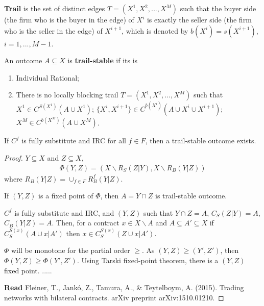 \documentclass[11pt]{elegantbook}
\begin{document}
\begin{definition}[Trail]
    \normalfont
    \textbf{Trail} is the set of distinct edges $T=(X^1,X^2,...,X^M)$ such that the buyer side (the firm who is the buyer in the edge) of $X^i$ is exactly the seller side (the firm who is the seller in the edge) of $X^{i+1}$, which is denoted by $b(X^i)=s(X^{i+1})$, $i=1,...,M-1$.
\end{definition}


\begin{definition}
    \normalfont
    An outcome $A\subseteq X$ is \textbf{trail-stable} if its is
    \begin{enumerate}
        \item Individual Rational;
        \item There is no locally blocking trail $T=(X^1,X^2,...,X^M)$ such that
        \subitem $X^1\in C^{S(X^1)}(A\cup X^1)$;
        \subitem $\{X^i,X^{i+1}\}\in C^{b(X^{i})}(A\cup X^i\cup X^{i+1})$;
        \subitem $X^M\in C^{b(X^M)}(A\cup X^M)$.
    \end{enumerate}
\end{definition}

\begin{theorem}[Fleiner et al. 2016]
    If $C^f$ is fully substitute and IRC for all $f\in F$, then a trail-stable outcome exists.
\end{theorem}
\begin{proof}
    $Y\subseteq X$ and $Z\subseteq X$,
    \begin{equation}
        \begin{aligned}
            \Phi (Y,Z)=\left(X\backslash R_S(Z|Y), X\backslash R_B(Y|Z)\right)
        \end{aligned}
        \nonumber
    \end{equation}
    where $R_B(Y|Z)=\cup_{f\in F}R_B^f(Y|Z)$.
    \begin{claim}
        If $(Y,Z)$ is a fixed point of $\Phi$, then $A=Y\cap Z$ is trail-stable outcome.
    \end{claim}
    \begin{lemma}
        $C^f$ is fully substitute and IRC, and $(Y,Z)$ such that $Y \cap Z=A$, $C_S(Z|Y)=A$, $C_B(Y|Z)=A$. Then, for a contract $x\in X\backslash A$ and $A\subseteq A'\subseteq X$ if $C_S^{S(x)}(A\cup x|A')$ then $x\in C_S^{S(x)}(Z\cup x|A')$.
    \end{lemma}
    $\Phi$ will be monotone for the partial order $\geq$. As $(Y,Z)\geq (Y',Z')$, then $\Phi(Y,Z)\geq \Phi (Y',Z')$. Using Tarski fixed-point theorem, there is a $(Y,Z)$ fixed point.
    .....


    \textbf{Read} \textnormal{Fleiner, T., Jankó, Z., Tamura, A., \& Teytelboym, A. (2015). Trading networks with bilateral contracts. arXiv preprint arXiv:1510.01210.}
\end{proof}
\end{document}
